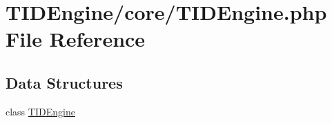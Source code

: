 \hypertarget{_t_i_d_engine_8php}{
\section{TIDEngine/core/TIDEngine.php File Reference}
\label{_t_i_d_engine_8php}
}
\subsection*{Data Structures}
\begin{DoxyCompactItemize}
\item 
class \hyperlink{class_t_i_d_engine}{TIDEngine}
\end{DoxyCompactItemize}
